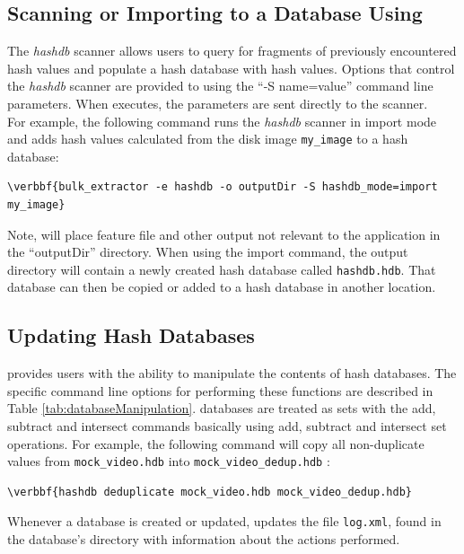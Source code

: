 \documentclass[11pt,fleqn]{article} %
\begin{document}
\subsection{Scanning or Importing to a Database Using \bulk}
\label{bulkextractorSection}
The \bulk \textit{hashdb} scanner allows users to query for fragments of previously encountered hash values and populate a hash database with hash values. Options that control the \textit{hashdb} scanner are provided to \bulk using the ``-S name=value'' command line parameters. When \bulk executes, the parameters are sent directly to the scanner.\\

For example, the following command runs the \bulk \textit{hashdb} scanner in import mode and adds hash values calculated from the disk image \texttt{my\_image} to a hash database:
\begin{Verbatim}[commandchars=\\\{\}]
\verbbf{bulk_extractor -e hashdb -o outputDir -S hashdb_mode=import my_image}
\end{Verbatim}
Note, \bulk will place feature file and other output not relevant to the \hdb application in the ``outputDir'' directory. When using the import command, the output directory will contain a newly created hash database called \texttt{hashdb.hdb}. That database can then be copied or added to a hash database in another location.


\subsection{Updating Hash Databases}
\label{updateSection}
\hdb provides users with the ability to manipulate the contents of hash databases. The specific command line options for performing these functions are described in Table \ref{tab:databaseManipulation}. \hdb databases are treated as sets with the add, subtract and intersect commands basically using add, subtract and intersect set operations. For example, the following command will  copy all non-duplicate values from \texttt{mock\_video.hdb} into \texttt{mock\_video\_dedup.hdb} :
\begin{Verbatim}[commandchars=\\\{\}]
\verbbf{hashdb deduplicate mock_video.hdb mock_video_dedup.hdb}
\end{Verbatim}
Whenever a database is created or updated, \hdb updates the file \texttt{log.xml}, found in the database's directory with information about the actions performed.\\
\end{document}
